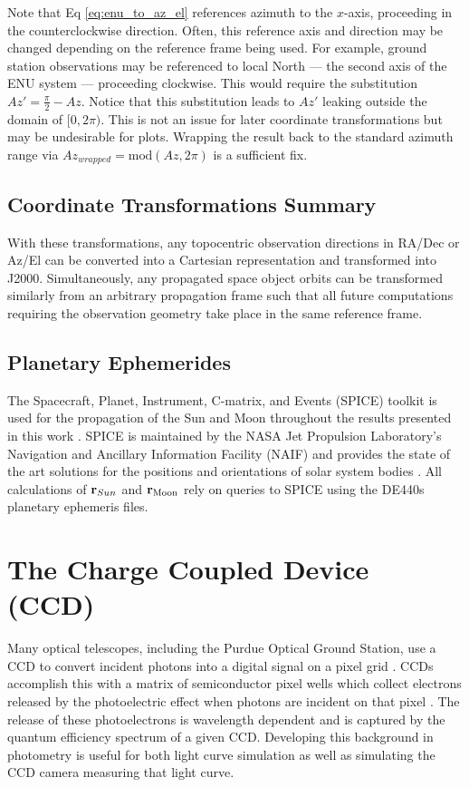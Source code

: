 Note that Eq \ref{eq:enu_to_az_el} references azimuth to the $x$-axis, proceeding in the
counterclockwise direction. Often, this reference axis and direction may be changed depending on the
reference frame being used. For example, ground station observations may be referenced to local
North ---  the second axis of the ENU system ---  proceeding clockwise. This would require the
substitution $Az' = \frac{\pi}{2} - Az$. Notice that this substitution leads to $Az'$ leaking
outside the domain of $[0, 2\pi)$. This is not an issue for later coordinate transformations but
may be undesirable for plots. Wrapping the result back to the standard azimuth range via
$Az_{wrapped} = \textrm{mod}(Az, 2\pi)$ is a sufficient fix.

\subsection{Coordinate Transformations Summary}

With these transformations, any topocentric observation directions in RA/Dec or Az/El can be converted into a Cartesian representation and transformed into J2000. Simultaneously, any propagated space object orbits can be transformed similarly from an arbitrary propagation frame such that all future computations requiring the observation geometry take place in the same reference frame. 

\subsection{Planetary Ephemerides} \label{sec:planet_ephem}

The Spacecraft, Planet, Instrument, C-matrix, and Events (SPICE) toolkit is used for the propagation of the Sun and Moon throughout the results presented in this work \cite{spice}. SPICE is maintained by the NASA Jet Propulsion Laboratory's Navigation and Ancillary Information Facility (NAIF) and provides the state of the art solutions for the positions and orientations of solar system bodies \cite{spice}. All calculations of $\mathbf{r}_{Sun}$ and $\mathbf{r}_\mathrm{Moon}$ rely on queries to SPICE using the DE440s planetary ephemeris files.

\section{The Charge Coupled Device (CCD)} \label{sec:ccd_performance}

Many optical telescopes, including the Purdue Optical Ground Station, use a CCD to convert incident photons into a digital signal on a pixel grid \cite{krag2003}. CCDs accomplish this with a matrix of semiconductor pixel wells which collect electrons released by the photoelectric effect when photons are incident on that pixel \cite{krag2003}. The release of these photoelectrons is wavelength dependent and is captured by the quantum efficiency spectrum of a given CCD. Developing this background in photometry is useful for both light curve simulation as well as simulating the CCD camera measuring that light curve. 

